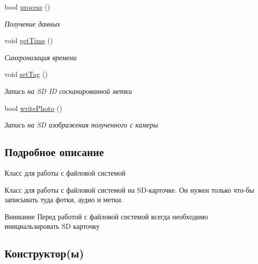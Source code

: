 \begin{DoxyCompactItemize}
bool \hyperlink{classunit_1_1_t_file_system_af7969ea11284d9f6f093687f0ba90082}{process} ()
\begin{DoxyCompactList}\small\item\em Получение данных \end{DoxyCompactList}\item 
void \hyperlink{classunit_1_1_t_file_system_aaf4766a6f4dcd6759e362ffc977615f5}{get\+Time} ()
\begin{DoxyCompactList}\small\item\em Синхронизация времени \end{DoxyCompactList}\item 
void \hyperlink{classunit_1_1_t_file_system_a79523b2edca3574ec6254af671f28256}{set\+Tag} ()
\begin{DoxyCompactList}\small\item\em Запись на SD ID сосканированной метки \end{DoxyCompactList}\item 
\mbox{\label{classunit_1_1_t_file_system_aacd7aae1827432b04c06b9a1d440b949}} 
bool \hyperlink{classunit_1_1_t_file_system_aacd7aae1827432b04c06b9a1d440b949}{write\+Photo} ()
\begin{DoxyCompactList}\small\item\em Запись на SD изображения полученного с камеры \end{DoxyCompactList}\end{DoxyCompactItemize}


\subsection{Подробное описание}
Класс для работы с файловой системой 

Класс для работы с файловой системой на S\+D-\/карточке. Он нужен только что-\/бы записывать туда фотки, аудио и метки. \begin{DoxyAttention}{Внимание}
Перед работой с файловой системой всегда необходимо инициальзировать SD карточку 
\end{DoxyAttention}


\subsection{Конструктор(ы)}
\mbox{\label{classunit_1_1_t_file_system_ac45162c4d69b6661aab204724af57322}} 
